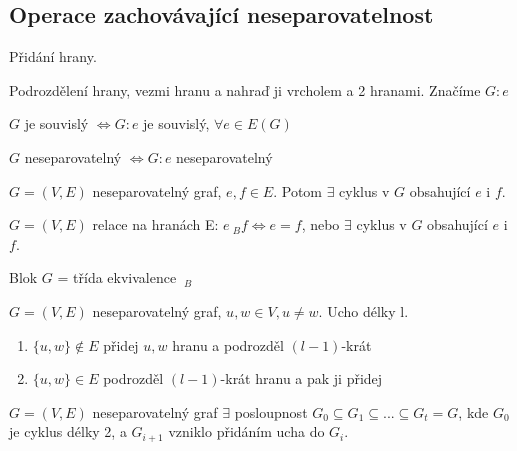 \documentclass[../main.tex]{subfiles}
\begin{document}
\subsection{Operace zachovávající neseparovatelnost}

Přidání hrany.

Podrozdělení hrany, vezmi hranu a nahraď ji vrcholem a 2 hranami. Značíme $G:e$

\begin{claim}
    $G$ je souvislý $\Leftrightarrow G:e$ je souvislý, $\forall e \in E(G)$
\end{claim}


\begin{lemma}
    $G$ neseparovatelný $\Leftrightarrow G:e$ neseparovatelný
\end{lemma}


\begin{corollary}
    $G=(V,E)$ neseparovatelný graf, $e,f\in E$. Potom $\exists$ cyklus v $G$ obsahující $e$ i $f$.
\end{corollary}

\begin{definition}
    $G=(V,E)$ relace na hranách E: $e ~_B f \Leftrightarrow e=f$, nebo $\exists$ cyklus v $G$ obsahující $e$ i $f$.
\end{definition}

\begin{definition}
    Blok $G$ = třída ekvivalence $~_B$
\end{definition}

\begin{definition}
    $G=(V,E)$ neseparovatelný graf, $u,w \in V, u\neq w$. Ucho délky l.
    
    \begin{enumerate}
        \item $\{u,w\}\notin E$ přidej ${u,w}$ hranu a podrozděl $(l-1)$-krát
        \item $\{u,w\}\in E$ podrozděl $(l-1)$-krát hranu a pak ji přidej 
    \end{enumerate}
\end{definition}

\begin{theorem}
    $G=(V,E)$ neseparovatelný graf $\exists$ posloupnost $G_0 \subseteq G_1 \subseteq ... \subseteq G_t = G$, kde $G_0$ je cyklus délky 2, 
    a $G_{i+1}$ vzniklo přidáním ucha do $G_i$.
\end{theorem}
\end{document}
